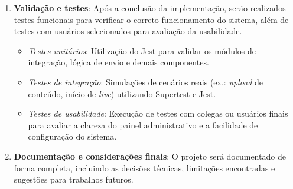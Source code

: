 \begin{enumerate}
        \item \textbf{Validação e testes}: 
            Após a conclusão da implementação, serão realizados testes funcionais para verificar o correto funcionamento do sistema, além de testes com usuários selecionados para avaliação da usabilidade.
        \par\vspace{0.25\baselineskip}
        
            \begin{itemize}
                \item \emph{Testes unitários}: 
                    Utilização do Jest para validar os módulos de integração, lógica de envio e demais componentes.  
                \par\vspace{0.25\baselineskip}
    
                \item \emph{Testes de integração}: 
                    Simulações de cenários reais (ex.: \textit{upload} de conteúdo, início de \textit{live}) utilizando Supertest e Jest.  
                \par\vspace{0.25\baselineskip}
    
                \item \emph{Testes de usabilidade}: 
                    Execução de testes com colegas ou usuários finais para avaliar a clareza do painel administrativo e a facilidade de configuração do sistema.  
                \par\vspace{0.5\baselineskip}
            \end{itemize}
        
        \item \textbf{Documentação e considerações finais}: 
            O projeto será documentado de forma completa, incluindo as decisões técnicas, limitações encontradas e sugestões para trabalhos futuros.
    \end{enumerate}
            


